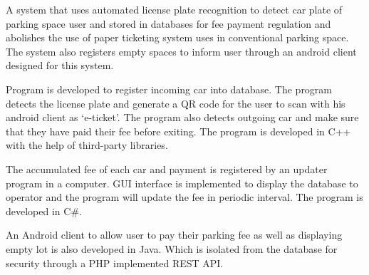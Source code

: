 \documentclass[letterpaper]{deedy-resume} %
\begin{document}
\begin{minipage}[t]{0.66\textwidth}
\vspace{\topsep}
\begin{tightitemize}
\item A system that uses automated license plate recognition to detect car plate of parking space user and stored
in databases for fee payment regulation and abolishes the use of paper ticketing system uses in conventional parking space. 
The system also registers empty spaces to inform user through an android client designed for this system.
\item Program is developed to register incoming car into database. 
The program detects the license plate and generate a QR code for the user to scan with his android client as ‘e-ticket’. 
The program also detects outgoing car and make sure that they have paid their fee before exiting. 
The program is developed in C++ with the help of third-party libraries.
\item The accumulated fee of each car and payment is registered by an updater program in a computer. 
GUI interface is implemented to display the database to operator and the program will update the fee in periodic interval. The program is developed in C\#.
\item An Android client to allow user to pay their parking fee as well as displaying empty lot is also developed in Java. 
Which is isolated from the database for security through a PHP implemented REST API.
\end{tightitemize} 
\sectionspace %

\end{minipage}
\end{document}

